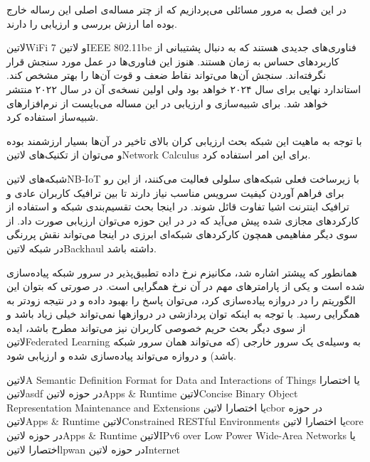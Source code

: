 
در این فصل به مرور مسائلی می‌پردازیم که از چتر مساله‌ی اصلی این رساله خارج بوده اما ارزش بررسی و ارزیابی را دارند.



‌لاتین{WiFi 7} و ‌لاتین{IEEE 802.11be} فناوری‌های جدیدی هستند که به دنبال پشتیبانی از کاربردهای حساس به زمان هستند. هنوز این فناوری‌ها در عمل مورد سنجش قرار نگرفته‌اند.
سنجش آن‌ها می‌تواند نقاط ضعف و قوت آن‌ها را بهتر مشخص کند. استاندارد نهایی برای سال ۲۰۲۴ خواهد بود ولی اولین نسخه‌ی آن در سال ۲۰۲۲ منتشر خواهد شد. برای شبیه‌سازی و ارزیابی در این
مساله می‌بایست از نرم‌افزارهای شبیه‌ساز استفاده کرد.

با توجه به ماهیت این شبکه بحث ارزیابی کران بالای تاخیر در آن‌ها بسیار ارزشمند بوده و می‌توان از تکنیک‌های ‌لاتین{Network Calculus} برای این امر استفاده کرد.


شبکه‌های ‌لاتین{NB-IoT} با زیرساخت فعلی شبکه‌های سلولی فعالیت می‌کنند، از این رو برای فراهم آوردن کیفیت سرویس مناسب نیاز دارند تا بین ترافیک کاربران عادی
و ترافیک اینترنت اشیا تفاوت قائل شوند. در اینجا بحث تقسیم‌بندی شبکه و استفاده از کارکردهای مجازی شده پیش می‌آید که در در این حوزه می‌توان ارزیابی صورت داد.
از سوی دیگر مفاهیمی همچون کارکردهای شبکه‌ای ابرزی در اینجا می‌تواند نقش پررنگی در شبکه ‌لاتین{Backhaul} داشته باشد.


همانطور که پیشتر اشاره شد، مکانیزم نرخ داده تطبیق‌پذیر در سرور شبکه پیاده‌سازی شده است و یکی از پارامترهای مهم در آن نرخ همگرایی است.
در صورتی که بتوان این الگوریتم را در دروازه پیاده‌سازی کرد، می‌توان پاسخ را بهبود داده و در نتیجه زودتر به همگرایی رسید.
با توجه به اینکه توان پردازشی در دروازهها نمی‌تواند خیلی زیاد باشد و از سوی دیگر بحث حریم خصوصی کاربران نیز می‌تواند مطرح باشد،
ایده ‌لاتین{Federated Learning} به وسیله‌ی یک سرور خارجی (که می‌تواند همان سرور شبکه باشد) و دروازه می‌تواند پیاده‌سازی شده
و ارزیابی شود.


 ‌لاتین{A Semantic Definition Format for Data and Interactions of Things} یا اختصارا ‌لاتین{asdf} در حوزه ‌لاتین{Apps \& Runtime}
 ‌لاتین{Concise Binary Object Representation Maintenance and Extensions} یا اختصارا ‌لاتین{cbor} در حوزه ‌لاتین{Apps \& Runtime}
 ‌لاتین{Constrained RESTful Environments} یا اختصارا ‌لاتین{core} در حوزه ‌لاتین{Apps \& Runtime}
 ‌لاتین{IPv6 over Low Power Wide-Area Networks} یا اختصارا ‌لاتین{lpwan} در حوزه ‌لاتین{Internet}

